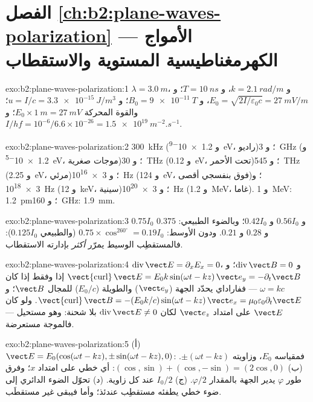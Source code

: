 \section*{الفصل \ref{ch:b2:plane-waves-polarization} --- الأمواج الكهرمغناطيسية المستوية والاستقطاب}

\begin{solution}{exo:b2:plane-waves-polarization:1}
$\lambda = \qty{3.0}{m}$، و $k = \qty{2.1}{rad/m}$، و $T = \qty{10}{ns}$؛ و $E_0 = \sqrt{2I/\varepsilon_0c}
= \qty{27}{mV/m}$، و $B_0 = \qty{9e-11}{T}$؛ و $u = I/c = \qty{3.3e-15}{J/m^3}$؛ والقوة المحركة
$E_0 \times \qty{1}{m} = \qty{27}{mV}$؛ و $I/hf = 10^{-6}/6.6 \times 10^{-26} = \qty{1.5e19}{m^{-2}.s^{-1}}$.
\end{solution}

\begin{solution}{exo:b2:plane-waves-polarization:2}
\qty{300}{kHz} (و \qty{1.2e-9}{eV}، راديو)؛ و \qty{3}{GHz} (و \qty{1.2e-5}{eV}، موجات صغرية)؛
و \qty{30}{THz} (و \qty{0.12}{eV}، تحت الأحمر)؛ و \qty{545}{THz} (و \qty{2.25}{eV}، مرئي)؛
و \qty{3e16}{Hz} (و \qty{124}{eV}، فوق بنفسجي أقصى)؛ و \qty{3e18}{Hz} (و \qty{12}{keV}، سينية)؛
و \qty{3e20}{Hz} (و \qty{1.2}{MeV}، غاما). و \qty{1}{MeV}: \qty{1.2}{pm}؛ و \qty{160}{GHz}: \qty{1.9}{mm}.
\end{solution}

\begin{solution}{exo:b2:plane-waves-polarization:3}
$0.75I_0$ و $0.56I_0$ و $0.42I_0$؛ وبالضوء الطبيعي: $0.375$ و $0.28$ و $0.21$. ودون
الأوسط: $0.75 \times \cos^260^\circ = 0.19I_0$ (والطبيعي $0.125I_0$): فالمستقطِب
الوسيط يمرّر \emph{أكثر} بإدارته
الاستقطاب.
\end{solution}

\begin{solution}{exo:b2:plane-waves-polarization:4}
$\operatorname{div}\vect E = \partial_xE_x = 0$، و $\operatorname{div}\vect B = 0$؛
و $\operatorname{\vect{curl}}\vect E = E_0k\sin(\omega t - kz)\,\vect e_y = -\partial_t\vect B$ إذا وفقط إذا كان $\omega =
kc$ --- ففاراداي يحدّد الجهة ($\vect e_y$) والطويلة
($E_0/c$) للمجال $\vect B$؛ و $\operatorname{\vect{curl}}\vect B = -(E_0k/c)\sin(\omega t - kz)\,\vect e_x
= \mu_0\varepsilon_0\partial_t\vect E$. ولو كان $\vect E$ على امتداد $\vect e_z$ لكان $\operatorname{div}
\vect E \ne 0$ بلا شحنة: وهو مستحيل --- فالموجة مستعرضة.
\end{solution}

\begin{solution}{exo:b2:plane-waves-polarization:5}
(أ) $\vect E = E_0(\cos(\omega t - kz), \pm\sin(\omega t - kz), 0)$: فمقياسه $E_0$،
وزاويته $\pm(\omega t - kz)$. (ب) $(\cos, \sin) + (\cos, -\sin) = (2\cos, 0)$: أي خطي
على امتداد $x$؛ وفرق طور $\varphi$ يدير الجهة بالمقدار $\varphi/2$. (ج)
$I_0/2$ عند كل زاوية. (د)  تحوّل الضوء الدائري
إلى ضوء خطي يطفئه مستقطِب عندئذ؛ وأما 
فيبقى غير مستقطَب.
\end{solution}

